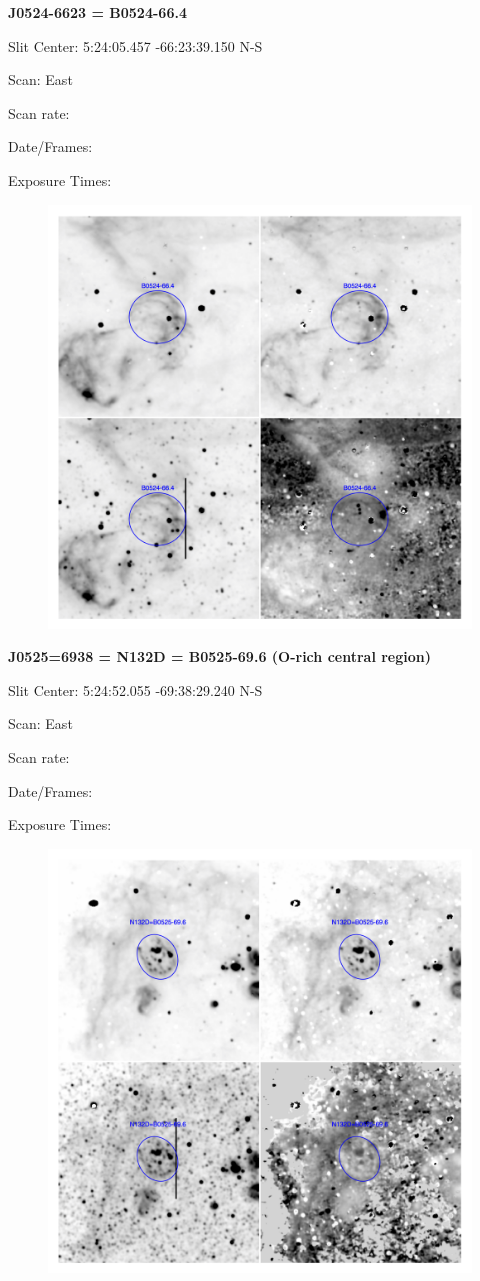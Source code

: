 \documentclass[11pt]{article}
\begin{document}
\newpage
{\bf J0524-6623 = B0524-66.4}  
 
Slit Center:   5:24:05.457   -66:23:39.150 N-S

Scan:  East

Scan rate:  

Date/Frames:

Exposure Times:  

\begin{figure}
\includegraphics[width=11.cm]{snapshots/B0524-664.png}
\end{figure}

\newpage
{\bf J0525=6938 = N132D = B0525-69.6 (O-rich central region)}  
 
Slit Center:   5:24:52.055   -69:38:29.240 N-S

Scan:  East

Scan rate:  

Date/Frames:

Exposure Times:  

\begin{figure}
\includegraphics[width=11.cm]{snapshots/N132D.png}
\end{figure}
\end{document}
